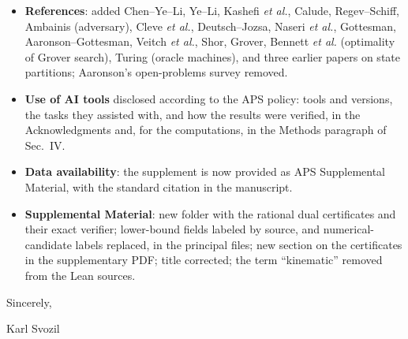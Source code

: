 \documentclass[11pt]{article}
\begin{document}
\begin{itemize}[leftmargin=*]
the examples that keep the classical values fixed. New
remark that the Deutsch and
Bernstein--Vazirani separations use only Clifford operations, so stabilizer
simulability and query advantage are distinct (with Gottesman,
Aaronson--Gottesman, and Veitch \emph{et al.}); Shor and Grover cited;
asymptotic remark sharpened; a second open question (which response is
optimal for several queries); and a closing paragraph that summarizes what
the paper adds and states that all effects found are constant factors.
\item \textbf{References}: added Chen--Ye--Li, Ye--Li, Kashefi \emph{et al.},
Calude, Regev--Schiff, Ambainis (adversary), Cleve \emph{et al.},
Deutsch--Jozsa, Naseri \emph{et al.}, Gottesman, Aaronson--Gottesman,
Veitch \emph{et al.}, Shor, Grover, Bennett \emph{et al.} (optimality of
Grover search), Turing (oracle machines), and three earlier papers on
state partitions;
Aaronson's open-problems survey removed.
\item \textbf{Use of AI tools} disclosed according to the APS policy: tools and
versions, the tasks they assisted with, and how the results were verified, in
the Acknowledgments and, for the computations, in the Methods paragraph of
Sec.~IV.
\item \textbf{Data availability}: the supplement is now provided as APS
Supplemental Material, with the standard citation in the manuscript.
\item \textbf{Supplemental Material}: new folder with the rational dual
certificates and their exact verifier; lower-bound fields labeled by source,
and numerical-candidate labels replaced, in the principal files; new section
on the certificates in the supplementary PDF; title corrected; the term
``kinematic'' removed from the Lean sources.
\end{itemize}

Sincerely,

Karl Svozil
\end{document}
